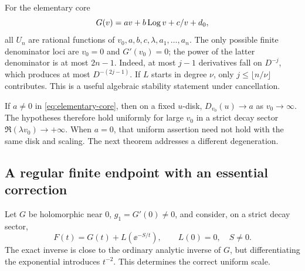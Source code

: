 For the elementary core
\begin{equation}\label{eq:elementary-core}
 G(v)=av+b\operatorname{Log} v+c/v+d_0,
\end{equation}
all \(U_n\) are rational functions of
\(v_0,a,b,c,\lambda,a_1,\ldots,a_n\).
The only possible finite denominator loci are \(v_0=0\) and
\(G'(v_0)=0\); the power of the latter denominator is at most
\(2n-1\).  Indeed, at most \(j-1\) derivatives fall on
\(D^{-j}\), which produces at most \(D^{-(2j-1)}\).
If \(L\) starts in degree \(\nu\), only
\(j\le\lfloor n/\nu\rfloor\) contributes.
This is a useful algebraic stability statement under cancellation.

If \(a\ne0\) in \cref{eq:elementary-core}, then on a fixed
\(u\)-disk, \(D_{v_0}(u)\to a\) as \(v_0\to\infty\).
The hypotheses therefore hold uniformly for large \(v_0\) in a
strict decay sector \(\Re(\lambda v_0)\to+\infty\).
When \(a=0\), that uniform assertion need not hold with the same
disk and scaling.  The next theorem addresses a different degeneration.

\subsection{A regular finite endpoint with an essential correction}

Let \(G\) be holomorphic near \(0\), \(g_1=G'(0)\ne0\), and
consider, on a strict decay sector,
\begin{equation}\label{eq:finite-endpoint-form}
 F(t)=G(t)+L(\ee^{-S/t}),\qquad L(0)=0,\quad S\ne0.
\end{equation}
The exact inverse is close to the ordinary analytic inverse of \(G\),
but differentiating the exponential introduces \(t^{-2}\).
This determines the correct uniform scale.

